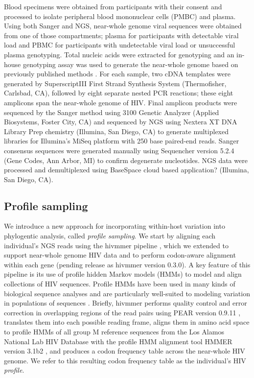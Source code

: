 \documentclass[letterpaper]{article}
\begin{document}
Blood specimens were obtained from participants with their consent and processed to isolate peripheral blood mononuclear cells (PMBC) and plasma. Using both Sanger and NGS, near-whole genome viral sequences were obtained from one of those compartments; plasma for participants with detectable viral load and PBMC for participants with undetectable viral load or unsuccessful plasma genotyping. Total nucleic acids were extracted for genotyping and an in-house genotyping assay was used to generate the near-whole genome based on previously published methods \parencite{nadai, di_giallonardo}. For each sample, two cDNA templates were generated by SuperscriptIII First Strand Synthesis System (Thermofisher, Carlsbad, CA), followed by eight separate nested PCR reactions; these eight amplicons span the near-whole genome of HIV.  Final amplicon products were sequenced by the Sanger method using 3100 Genetic Analyzer (Applied Biosystems, Foster City, CA) and sequenced by NGS using Nextera XT DNA Library Prep chemistry (Illumina, San Diego, CA) to generate multiplexed libraries for Illumina's MiSeq platform with 250 base paired-end reads. Sanger consensus sequences were generated manually using Sequencher version 5.2.4 (Gene Codes, Ann Arbor, MI) to confirm degenerate nucleotides. NGS data were processed and demultiplexed using BaseSpace cloud based application? (Illumina, San Diego, CA).

\subsection*{Profile sampling}

We introduce a new approach for incorporating within-host variation into phylogentic analysis, called \emph{profile sampling}. We start by aligning each individual's NGS reads using the hivmmer pipeline \parencite{howison}, which we extended to support near-whole genome HIV data and to perform codon-aware alignment within each gene (pending release as hivmmer version 0.3.0). A key feature of this pipeline is its use of profile hidden Markov models (HMMs) to model and align collections of HIV sequences. Profile HMMs have been used in many kinds of biological sequence analyses and are particularly well-suited to modeling variation in populations of sequences \parencite{eddy2004}. Briefly, hivmmer performs quality control and error correction in overlapping regions of the read pairs using PEAR version 0.9.11 \parencite{zhang}, translates them into each possible reading frame, aligns them in amino acid space to profile HMMs of all group M reference sequences from the Los Alamos National Lab HIV Database \parencite{losalamos} with the profile HMM alignment tool HMMER version 3.1b2 \parencite{eddy2013}, and produces a codon frequency table across the near-whole HIV genome. We refer to this resulting codon frequency table as the individual's HIV \emph{profile}.
\end{document}

